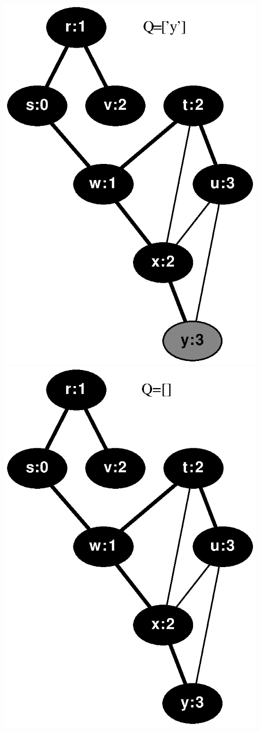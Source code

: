 \documentclass{article}
\begin{document}
\includegraphics[height=.3\textheight]{clrs_example_bfs_07.eps}
\vspace{1em}
\includegraphics[height=.3\textheight]{clrs_example_bfs_08.eps}
\end{document}
